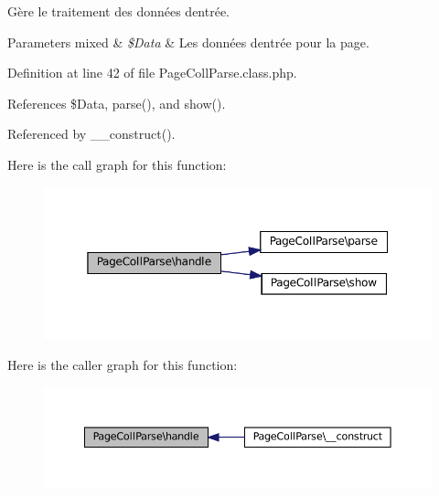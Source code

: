 Gère le traitement des données d\textquotesingle{}entrée.


\begin{DoxyParams}[1]{Parameters}
mixed & {\em \$\+Data} & Les données d\textquotesingle{}entrée pour la page. \\
\hline
\end{DoxyParams}


Definition at line 42 of file Page\+Coll\+Parse.\+class.\+php.



References \$\+Data, parse(), and show().



Referenced by \+\_\+\+\_\+construct().

Here is the call graph for this function\+:\nopagebreak
\begin{figure}[H]
\begin{center}
\leavevmode
\includegraphics[width=350pt]{class_page_coll_parse_a820526f8ea9a75f90ee25057bb7d072a_cgraph}
\end{center}
\end{figure}
Here is the caller graph for this function\+:\nopagebreak
\begin{figure}[H]
\begin{center}
\leavevmode
\includegraphics[width=350pt]{class_page_coll_parse_a820526f8ea9a75f90ee25057bb7d072a_icgraph}
\end{center}
\end{figure}
\mbox{\label{class_page_coll_parse_a1c597aac0c341568337b177194428178}} 
